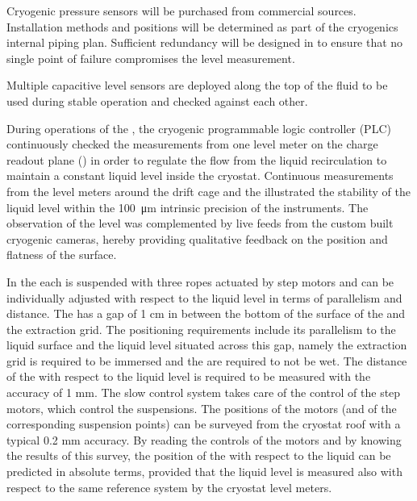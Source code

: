 Cryogenic pressure sensors will be purchased from commercial sources.
Installation methods and positions will be determined as part of the
cryogenics internal piping plan.  Sufficient redundancy will be designed in
to ensure that no single point of failure compromises the level measurement.

Multiple capacitive level sensors are deployed along the top of
the fluid to be used during stable operation and checked against each
other.

During operations of the , the cryogenic programmable logic controller (PLC) continuously checked the measurements from one level meter on the charge readout plane () in order to regulate the flow from the liquid recirculation to maintain a constant liquid level inside the cryostat. Continuous measurements from the level meters around the drift cage and the  illustrated the stability of the liquid level within the \SI{100}{\micro\meter} intrinsic precision of the instruments. The observation of the level was complemented by live feeds from the custom built cryogenic cameras, hereby providing qualitative feedback on the position and flatness of the surface.

 In the  each  is suspended with three ropes actuated by step motors and can be individually adjusted with respect to the liquid level in terms of parallelism and distance. The  has a gap of 1 cm in between the bottom of the surface of the  and the extraction grid. The  positioning requirements include its parallelism to the liquid surface and the liquid level situated across this gap, namely the extraction grid is required to be immersed and the  are required to not be wet.  The distance of the  with respect to the liquid level is required to be measured with the accuracy of 1 mm. The slow control system takes care of the control of the step motors, which control the  suspensions. The positions of the motors (and of the corresponding suspension points) can be surveyed from the cryostat roof with a typical 0.2 mm accuracy. By reading the controls of the motors and by knowing the results of this survey, the position of the  with respect to the liquid can be predicted in absolute terms, provided that the liquid level is measured also with respect to the same reference system by the cryostat level meters. 
 

